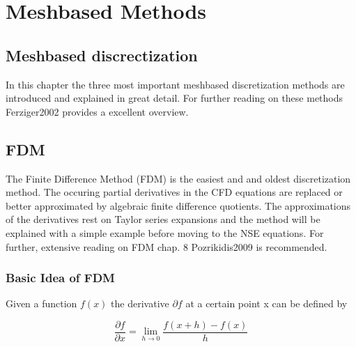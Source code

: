 %
%
%

\chapter{Meshbased Methods} %

\label{Chapter4} %



\section{Meshbased discrectization}

In this chapter the three most important meshbased discretization methods are introduced and explained in great detail. For further reading on these methods
Ferziger2002 provides a excellent overview. 


\section{FDM}

The Finite Difference Method (FDM) is the easiest and and oldest discretization method. The occuring partial derivatives in the CFD equations
are replaced or better approximated by algebraic finite difference quotients. The approximations of the derivatives rest on Taylor series
expansions and the method will be explained with a simple example before moving to 
the NSE equations. For further, extensive reading on FDM chap. 8 Pozrikidis2009 is recommended.

\subsection{Basic Idea of FDM}

Given a function $ f(x) $ the derivative $\partial f$  at a certain point x can be defined by


\begin{equation} \label{eq:fdm_con}
\frac {\partial f}{\partial x}  = 
\lim_{h \to 0} \frac {f(x+h)-f(x)}{h} 
\end{equation}

